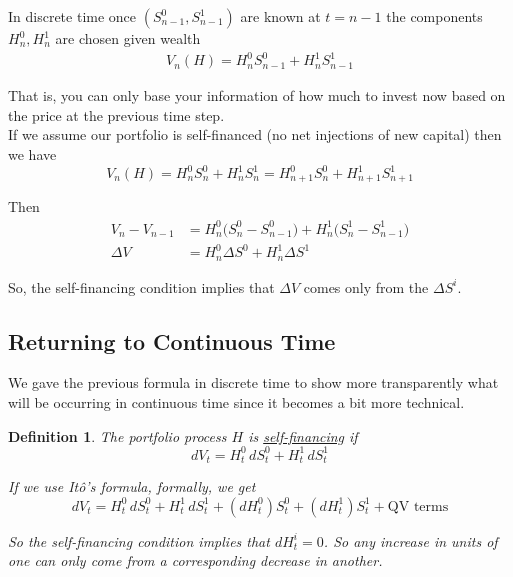 \documentclass[12pt]{article}
\newtheorem{definition}{Definition}
\newlength\tindent
\renewcommand{\indent}{\hspace*{\tindent}}
\begin{document}
\indent In discrete time once $(S^0_{n-1},S^1_{n-1})$ are known at $t = n-1$ the components $H^0_n, H^1_n$ are chosen given wealth
\begin{align*}
	V_n(H) = H^0_nS^0_{n-1} + H^1_nS^1_{n-1}
\end{align*}

\indent That is, you can only base your information of how much to invest now based on the price at the previous time step. \\

If we assume our portfolio is self-financed (no net injections of new capital) then we have
\begin{equation*}
	V_n(H) = H^0_nS^0_n + H^1_nS^1_n = H^0_{n+1}S^0_n + H^1_{n+1}S^1_{n+1} 
\end{equation*}

Then
\begin{align*}
	V_n - V_{n-1} &= H^0_n\big(S^0_n - S^0_{n-1}\big) + H^1_n\big(S^1_n - S^1_{n-1}\big) \\
	\Delta V &= H^0_n\Delta S^0 + H^1_n\Delta S^1
\end{align*}

So, the self-financing condition implies that $\Delta V$ comes only from the $\Delta S^i$.

\subsection{Returning to Continuous Time}

\indent We gave the previous formula in discrete time to show more transparently what will be occurring in continuous time since it becomes a bit more technical.

\begin{definition} The portfolio process $H$ is \underline{self-financing} if
\begin{equation*}
	dV_t = H^0_t\,dS^0_t + H^1_t\,dS^1_t
\end{equation*}

If we use It\^{o}'s formula, formally, we get
\begin{equation*}
	dV_t = H^0_t\,dS^0_t + H^1_t\,dS^1_t + (dH^0_t)S^0_t + (dH^1_t)S^1_t + \text{QV terms}
\end{equation*}

\indent So the self-financing condition implies that $dH^i_t = 0$. So any increase in units of one can only come from a corresponding decrease in another.
\end{definition}
\end{document}
